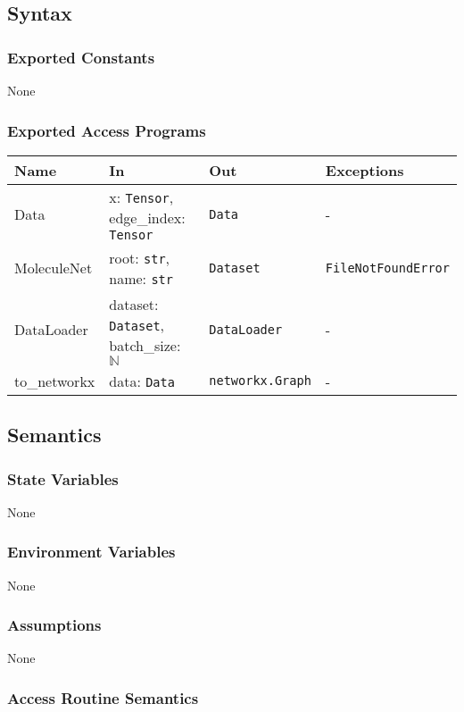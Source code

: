 \documentclass[12pt, titlepage]{article}
\begin{document}
\subsection{Syntax}

\subsubsection{Exported Constants}
None

\subsubsection{Exported Access Programs}

\begin{center}
\begin{tabular}{p{3.2cm} p{5.5cm} p{4cm} p{2.5cm}}
\hline
\textbf{Name} & \textbf{In} & \textbf{Out} & \textbf{Exceptions} \\
\hline
Data & x: \texttt{Tensor}, edge\_index: \texttt{Tensor} & \texttt{Data} & - \\
MoleculeNet & root: \texttt{str}, name: \texttt{str} & \texttt{Dataset} & \texttt{FileNotFoundError} \\
DataLoader & dataset: \texttt{Dataset}, batch\_size: \(\mathbb{N}\) & \texttt{DataLoader} & - \\
to\_networkx & data: \texttt{Data} & \texttt{networkx.Graph} & - \\
\hline
\end{tabular}
\end{center}

\subsection{Semantics}

\subsubsection{State Variables}
None

\subsubsection{Environment Variables}
None

\subsubsection{Assumptions}
None

\subsubsection{Access Routine Semantics}
\end{document}
